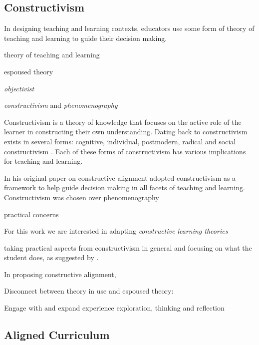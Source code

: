 \subsection{Constructivism} %
\label{sub:constructivism}

In designing teaching and learning contexts, educators use some form of theory of teaching and learning to guide their decision making.

theory of teaching and learning

espoused theory \cite{Argyris:1976}

\emph{objectivist}

\emph{constructivism} and \emph{phenomenography}


\cite{Duffy:1996} 




\cite{Montessori:1946}

Constructivism is a theory of knowledge that focuses on the active role of the learner in constructing their own understanding. Dating back to \citet{Piaget:1950} constructivism exists in several forms: cognitive, individual, postmodern, radical and social constructivism \cite{Phillips:1995,Steffe:1995}. Each of these forms of constructivism has various implications for teaching and learning.









In his original paper on constructive alignment \citet{Biggs:1996c} adopted constructivism as a framework to help guide decision making in all facets of teaching and learning. Constructivism was chosen over phenomenography 

practical concerns


For this work we are interested in adapting \emph{constructive learning theories}

 taking practical aspects from constructivism in general and focusing on what the student does, as suggested by .


In proposing constructive alignment, 

Disconnect between theory in use and espoused theory: \cite{Phillips:2005}


Engage with and expand experience \cite{Dewey:1960} exploration, thinking and reflection


\subsection{Aligned Curriculum} %
\label{sub:aligned_curriculum}

